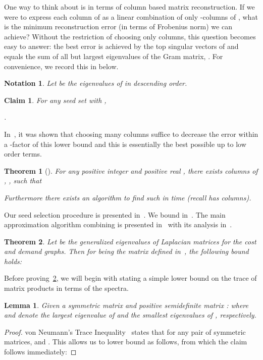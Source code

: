 \documentclass{article}
\newtheorem{theorem}{Theorem}[section]
\newtheorem{lemma}{Lemma}[section]
\newtheorem{claim}{Claim}[section]
\newtheorem{notation}{Notation}[section]
\newcounter{alg-count}
\newcommand{\vnote}[1]{}
\newcommand{\aknote}[1]{}
\begin{document}
One way to think about
 is in
terms of column based matrix reconstruction. If we were to express
each column of  as a linear combination of only
-columns of , what is the minimum reconstruction
error (in terms of Frobenius norm) we can achieve?
Without the restriction of choosing only columns, this question
becomes easy to answer: the best error is achieved by the top 
singular vectors of  and equals the sum of all but
largest  eigenvalues of the Gram matrix, . For convenience, we record this in
 below.
\begin{notation}
  Let  be the
  eigenvalues of  in descending
  order.
\end{notation}
\begin{claim}
  \label{lem:col-res-lb}
  For any seed set  with ,
  \vnote{Changed  to .}
.
\end{claim}
\aknote{Happily removed the proof :).}
In~\cite{gs11-svd}, it was shown that choosing 
many columns suffice to decrease the error within a -factor
of this lower bound and this is essentially the best possible up to
low order terms.
\begin{theorem}[\cite{gs11-svd}] \label{thm:choose-s} For any positive
  integer  and positive real , there exists  columns of ,
  , such that
	
  Furthermore there exists an algorithm to find such  in
  time  (recall  has  columns).
\end{theorem}
Our seed selection procedure is presented in~.  We
bound  in~. The main
approximation algorithm combining 
is presented in~ with its analysis
in~.
\begin{theorem} \label{lem:sigma-bnd} Let  be the generalized eigenvalues of
  Laplacian matrices for the cost and demand graphs.  Then for
   being the matrix defined in~, the
  following bound holds:

\end{theorem}
Before proving~\cref{lem:sigma-bnd}, we will begin with stating a
simple lower bound on the trace of matrix products in terms of the
spectra.
\begin{lemma}\label{thm:birkhoff} Given a symmetric matrix  and
  positive semidefinite matrix :
 where  and  denote the  largest
eigenvalue of  and the  smallest eigenvalues of ,
respectively.
\end{lemma} 
\begin{proof}
  von Neumann's Trace Inequality~\cite{hj-mat-book} states that  for any pair of symmetric
  matrices,  and . This allows us to lower bound  as
  follows, from which the claim follows immediately:
 
\end{proof}
\end{document}
